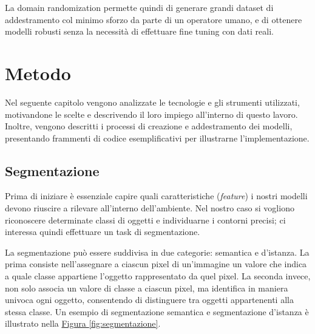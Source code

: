 \documentclass[12pt]{report}
\begin{document}
La domain randomization permette quindi di generare grandi dataset di addestramento col minimo sforzo da parte di un operatore umano, e di ottenere modelli robusti senza la necessità di effettuare fine tuning con dati reali.

\chapter{Metodo}
\label{chap:metodo}

Nel seguente capitolo vengono analizzate le tecnologie e gli strumenti utilizzati, motivandone le scelte e descrivendo il loro impiego all'interno di questo lavoro. Inoltre, vengono descritti i processi di creazione e addestramento dei modelli, presentando frammenti di codice esemplificativi per illustrarne l'implementazione.


\section{Segmentazione}
\label{sec:segmentazione}

Prima di iniziare è essenziale capire quali caratteristiche (\textit{feature}) i nostri modelli devono riuscire a rilevare all'interno dell'ambiente. Nel nostro caso si vogliono riconoscere determinate classi di oggetti e individuarne i contorni precisi; ci interessa quindi effettuare un task di segmentazione.

La segmentazione può essere suddivisa in due categorie: semantica e d'istanza. La prima consiste nell'assegnare a ciascun pixel di un'immagine un valore che indica a quale classe appartiene l'oggetto rappresentato da quel pixel. La seconda invece, non solo associa un valore di classe a ciascun pixel, ma identifica in maniera univoca ogni oggetto, consentendo di distinguere tra oggetti appartenenti alla stessa classe. Un esempio di segmentazione semantica e segmentazione d'istanza è illustrato nella \hyperref[fig:segmentazione]{Figura \ref{fig:segmentazione}}.
\end{document}
